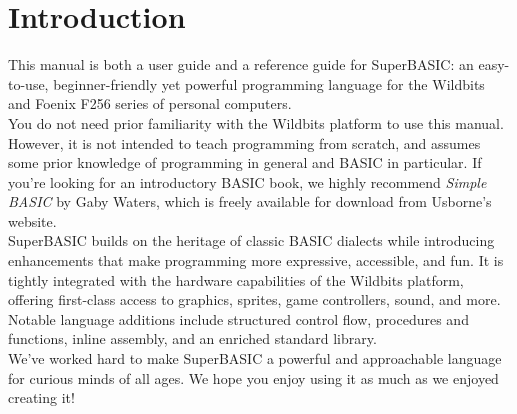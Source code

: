 \chapter*{Introduction}

This manual is both a user guide and a reference guide for SuperBASIC: an easy-to-use, beginner-friendly yet powerful programming language for the Wildbits and Foenix F256 series of personal computers. \\

You do not need prior familiarity with the Wildbits platform to use this manual. However, it is not intended to teach programming from scratch, and assumes some prior knowledge of programming in general and BASIC in particular. If you're looking for an introductory BASIC book, we highly recommend \textit{Simple BASIC} by Gaby Waters, which is freely available for download from Usborne's website. \\

SuperBASIC builds on the heritage of classic BASIC dialects while introducing enhancements that make programming more expressive, accessible, and fun. It is tightly integrated with the hardware capabilities of the Wildbits platform, offering first-class access to graphics, sprites, game controllers, sound, and more. Notable language additions include structured control flow, procedures and functions, inline assembly, and an enriched standard library. \\

We've worked hard to make SuperBASIC a powerful and approachable language for curious minds of all ages. We hope you enjoy using it as much as we enjoyed creating it!